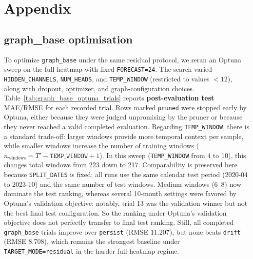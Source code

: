 \documentclass[pdflatex,sn-basic]{sn-jnl}
\begin{document}
\appendix
\section{Appendix}


\subsection{graph\_base optimisation}
To optimize \texttt{graph\_base} under the same residual protocol, we reran an Optuna sweep on the
full heatmap with fixed \texttt{FORECAST=24}.
The search varied \texttt{HIDDEN\_CHANNELS}, \texttt{NUM\_HEADS}, and \texttt{TEMP\_WINDOW}
(restricted to values $<12$), along with dropout, optimizer, and graph-configuration choices.
Table~\ref{tab:graph_base_optuna_trials} reports
\textbf{post-evaluation test} MAE/RMSE for each recorded trial.
Rows marked \texttt{pruned} were stopped early by Optuna, either because they were judged unpromising
by the pruner or because they never reached a valid completed evaluation.
\newline
Regarding \texttt{TEMP\_WINDOW}, there is a standard trade-off: larger windows provide more temporal context per sample,
while smaller windows increase the number of training windows (\(n_{\text{windows}} = T' - \texttt{TEMP\_WINDOW} + 1\)).
In this sweep (\texttt{TEMP\_WINDOW} from 4 to 10), this changes total windows from 223 down to 217.
Comparability is preserved here because \texttt{SPLIT\_DATES} is fixed; all runs use the same calendar test period
(2020-04 to 2023-10) and the same number of test windows.
Medium windows (6--8) now dominate the test ranking, whereas several 10-month settings were favored by
Optuna's validation objective; notably, trial 13 was the validation winner but not the best final test
configuration. So the ranking under Optuna's validation objective does not perfectly transfer to final test ranking.
Still, all completed \texttt{graph\_base} trials improve over \texttt{persist} (RMSE 11.207), but none beats
\texttt{drift} (RMSE 8.708), which remains the strongest baseline under \texttt{TARGET\_MODE=residual} in the
harder full-heatmap regime.
\end{document}
